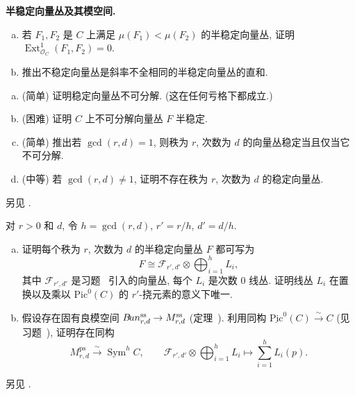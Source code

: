 \textbf{半稳定向量丛及其模空间.}
\begin{exercise}[不稳定丛, 简单]\label{src:9.1.45}
\begin{enumerate}[(a)]
\item 若 $F_1,F_2$ 是 $C$ 上满足 $\mu(F_1)<\mu(F_2)$ 的半稳定向量丛, 证明 $\operatorname{Ext}_{\mathcal O_C}^1(F_1,F_2)=0$.
\item 推出不稳定向量丛是斜率不全相同的半稳定向量丛的直和.
\end{enumerate}
\end{exercise}
\begin{exercise}[稳定丛与不可分解丛]\label{src:9.1.46}
\begin{enumerate}[(a)]
\item (简单) 证明稳定向量丛不可分解. (这在任何亏格下都成立.)
\item (困难) 证明 $C$ 上不可分解向量丛 $F$ 半稳定.
\item (简单) 推出若 $\gcd(r,d)=1$, 则秩为 $r$, 次数为 $d$ 的向量丛稳定当且仅当它不可分解.
\item (中等) 若 $\gcd(r,d)\ne1$, 证明不存在秩为 $r$, 次数为 $d$ 的稳定向量丛.
\end{enumerate}
另见 \cite[附录 A]{Tu93}.
\end{exercise}
\begin{exercise}[困难]\label{src:9.1.47}
对 $r>0$ 和 $d$, 令 $h=\gcd(r,d)$, $r'=r/h$, $d'=d/h$.
\begin{enumerate}[(a)]
\item 证明每个秩为 $r$, 次数为 $d$ 的半稳定向量丛 $F$ 都可写为
\[
F\cong\mathcal F_{r',d'}\otimes\bigoplus_{i=1}^hL_i,
\]
其中 $\mathcal F_{r',d'}$ 是习题~ 引入的向量丛, 每个 $L_i$ 是次数 $0$ 线丛. 证明线丛 $L_i$ 在置换以及乘以 $\mathrm{Pic}^0(C)$ 的 $r'$-挠元素的意义下唯一.
\item 假设存在固有良模空间 $B\!un_{r,d}^{\mathrm{ss}}\to M_{r,d}^{\mathrm{ss}}$ (定理~). 利用同构 $\underline{\mathrm{Pic}}^0(C)\xrightarrow{\sim}C$ (见习题~), 证明存在同构
\[
M_{r,d}^{\mathrm{ps}}\xrightarrow{\sim}\operatorname{Sym}^hC,\qquad
\mathcal F_{r',d'}\otimes\bigoplus_{i=1}^hL_i\mapsto\sum_{i=1}^hL_i(p).
\]
\end{enumerate}
另见 \cite[定理 1, 2 和 16]{Tu93}.
\end{exercise}
